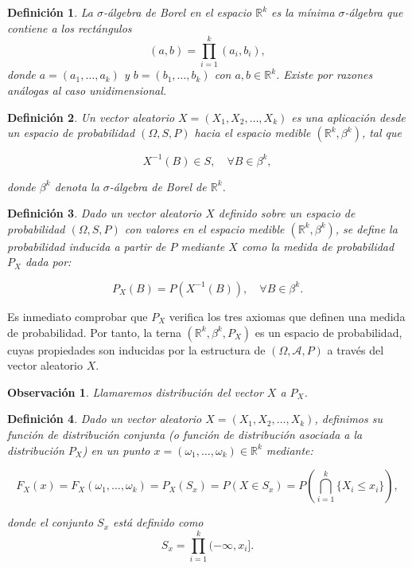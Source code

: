 \documentclass{report}
\newtheorem{dfn}{Definición}[section]
\newtheorem{obs}{Observación}[section]
\begin{document}
\begin{dfn}
La \emph{$\sigma$-álgebra de Borel} en el espacio \( \mathbb{R}^k \) es la mínima $\sigma$-álgebra que contiene a los rectángulos
\[
(a, b) = \prod_{i=1}^{k} (a_i, b_i),
\]
donde \( a = (a_1, \dots, a_k) \) y \( b = (b_1, \dots, b_k) \) con \( a, b \in \mathbb{R}^k \). Existe por razones análogas
al caso unidimensional.
\end{dfn}


\begin{dfn}
Un \emph{vector aleatorio} \( X = (X_1, X_2, \dots, X_k) \) es una aplicación desde un espacio de probabilidad \( (\Omega, S, P) \)
hacia el espacio medible \( (\mathbb{R}^k, \beta^k) \), tal que

\[
X^{-1}(B) \in S, \quad \forall B \in \beta^k,
\]

donde \( \beta^k \) denota la \(\sigma\)-álgebra de Borel de \( \mathbb{R}^k \).
\end{dfn}

\begin{dfn}
Dado un vector aleatorio \( X \) definido sobre un espacio de probabilidad \( (\Omega, S, P) \)
con valores en el espacio medible \( (\mathbb{R}^k, \beta^k) \), se define la \emph{probabilidad inducida}
a partir de \( P \) mediante \( X \) como la medida de probabilidad \( P_X \) dada por:

\begin{equation}
P_X(B) = P(X^{-1}(B)), \quad \forall B \in \beta^k. \tag{3.1}
\end{equation}
\end{dfn}


Es inmediato comprobar que \( P_X \) verifica los tres axiomas que definen una medida de probabilidad. Por tanto,
la terna \( (\mathbb{R}^k, \beta^k, P_X) \) es un espacio de probabilidad, cuyas propiedades son inducidas
por la estructura de \( (\Omega, \mathcal{A}, P) \) a través del vector aleatorio \( X \).

\begin{obs}
    Llamaremos \emph{distribución} del vector \( X \) a \( P_X \).
\end{obs}

\begin{dfn}
Dado un vector aleatorio \( X = (X_1, X_2, \dots, X_k) \), definimos su \textit{función de distribución conjunta}
 (o \textit{función de distribución asociada} a la distribución \( P_X \)) en un punto \( x = (\omega_1, \dots, \omega_k) \in \mathbb{R}^k \) mediante:

\begin{equation*}
F_X(x) = F_X(\omega_1, \dots, \omega_k) = P_X(S_x) = P(X \in S_x) = P\left( \bigcap_{i=1}^{k} \{ X_i \leq x_i \} \right),
\end{equation*}

donde el conjunto \( S_x \) está definido como
\[
S_x = \prod_{i=1}^{k} (-\infty, x_i].
\]
\end{dfn}
\end{document}

